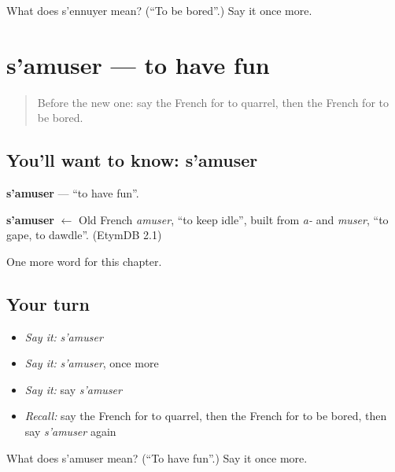 \begin{tcolorbox}[breakable,colback=teal!4,colframe=teal!35!black,title={Before you move on}]
What does s'ennuyer mean? (\textquotedblleft{}To be bored\textquotedblright{}.) Say it once more.
\end{tcolorbox}
\section[s'amuser]{s'amuser — to have fun}

\label{lesson:FR-C146-amuser}



\begin{quote}
Before the new one: say the French for to quarrel, then the French for to be bored.
\end{quote}

\subsection*{You'll want to know: s'amuser}
\textbf{s'amuser} — \textquotedblleft{}to have fun\textquotedblright{}.

\begin{cousinweb}
\textbf{s'amuser} $\leftarrow$ Old French \emph{amuser}, \textquotedblleft{}to keep idle\textquotedblright{}, built from \emph{a-} and \emph{muser}, \textquotedblleft{}to gape, to dawdle\textquotedblright{}. (EtymDB 2.1)
\end{cousinweb}

\begin{grammarlens}[title={What you've built}]
One more word for this chapter.
\end{grammarlens}

\subsection*{Your turn}
\begin{itemize}
\raggedright
  \item \emph{Say it:} \emph{s'amuser}
  \item \emph{Say it:} \emph{s'amuser}, once more
  \item \emph{Say it:} say \emph{s'amuser}
  \item \emph{Recall:} say the French for to quarrel, then the French for to be bored, then say \emph{s'amuser} again
\end{itemize}

\begin{tcolorbox}[breakable,colback=teal!4,colframe=teal!35!black,title={Before you move on}]
What does s'amuser mean? (\textquotedblleft{}To have fun\textquotedblright{}.) Say it once more.
\end{tcolorbox}
